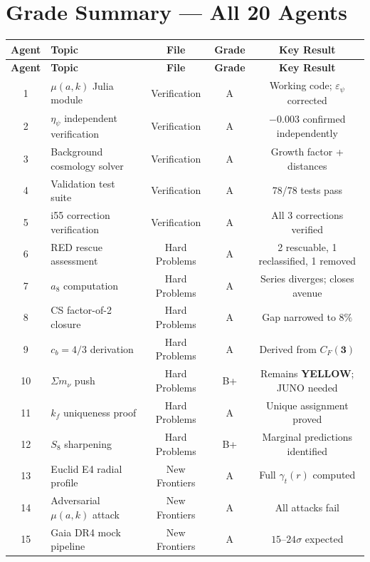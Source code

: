 \documentclass[11pt,a4paper]{article}
\newcommand{\YELLOW}{\textcolor{dfdyellow}{\textbf{YELLOW}}}
\begin{document}
\section{Grade Summary --- All 20 Agents}
\label{sec:grades}

\begin{center}
\begin{longtable}{clccc}
\toprule
\textbf{Agent} & \textbf{Topic} & \textbf{File} & \textbf{Grade} & \textbf{Key Result} \\
\midrule
\endfirsthead
\toprule
\textbf{Agent} & \textbf{Topic} & \textbf{File} & \textbf{Grade} & \textbf{Key Result} \\
\midrule
\endhead
1 & $\mu(a,k)$ Julia module & Verification & A & Working code; $\varepsilon_\psi$ corrected \\
2 & $\eta_\psi$ independent verification & Verification & A & $-0.003$ confirmed independently \\
3 & Background cosmology solver & Verification & A & Growth factor + distances \\
4 & Validation test suite & Verification & A & 78/78 tests pass \\
5 & i55 correction verification & Verification & A & All 3 corrections verified \\
\midrule
6 & RED rescue assessment & Hard Problems & A & 2 rescuable, 1 reclassified, 1 removed \\
7 & $a_8$ computation & Hard Problems & A & Series diverges; closes avenue \\
8 & CS factor-of-2 closure & Hard Problems & A & Gap narrowed to $8\%$ \\
9 & $c_b = 4/3$ derivation & Hard Problems & A & Derived from $C_F(\mathbf{3})$ \\
10 & $\Sigma m_\nu$ push & Hard Problems & B+ & Remains \YELLOW; JUNO needed \\
11 & $k_f$ uniqueness proof & Hard Problems & A & Unique assignment proved \\
12 & $S_8$ sharpening & Hard Problems & B+ & Marginal predictions identified \\
\midrule
13 & Euclid E4 radial profile & New Frontiers & A & Full $\gamma_t(r)$ computed \\
14 & Adversarial $\mu(a,k)$ attack & New Frontiers & A & All attacks fail \\
15 & Gaia DR4 mock pipeline & New Frontiers & A & $15$--$24\sigma$ expected \\

\end{longtable}
\end{center}
\end{document}
